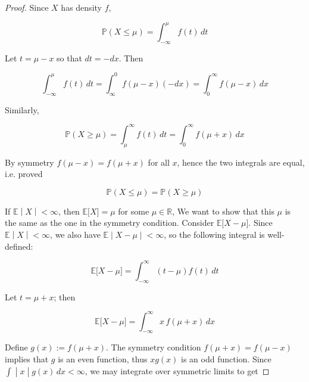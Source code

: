 \begin{proof}

Since \(\mathit{X}\) has density \(\mathit{f}\),

\[\mathbb{P}(\mathit{X} \leq \mathit{\mu}) = \int_{- \infty}^{\mathit{\mu}}\mathit{f}(\mathit{t})\,\mathit{d}\mathit{t}\]

Let \(\mathit{t} = \mathit{\mu} - \mathit{x}\) so that \(\mathit{d}\mathit{t} = - \mathit{d}\mathit{x}\). Then

\[\int_{- \infty}^{\mathit{\mu}}\mathit{f}(\mathit{t})\,\mathit{d}\mathit{t} = \int_{\infty}^{0}\mathit{f}(\mathit{\mu} - \mathit{x})( - \mathit{d}\mathit{x}) = \int_{0}^{\infty}\mathit{f}(\mathit{\mu} - \mathit{x})\,\mathit{d}\mathit{x}\]

Similarly,

\[\mathbb{P}(\mathit{X} \geq \mathit{\mu}) = \int_{\mathit{\mu}}^{\infty}\mathit{f}(\mathit{t})\,\mathit{d}\mathit{t} = \int_{0}^{\infty}\mathit{f}(\mathit{\mu} + \mathit{x})\,\mathit{d}\mathit{x}\]

By symmetry \(\mathit{f}(\mathit{\mu} - \mathit{x}) = \mathit{f}(\mathit{\mu} + \mathit{x})\) for all \(\mathit{x}\), hence the two integrals are equal, i.e. proved

\[\mathbb{P}(\mathit{X} \leq \mathit{\mu}) = \mathbb{P}(\mathit{X} \geq \mathit{\mu})\]

If \(\left. \mathbb{E} \middle| \mathit{X} \middle| < \infty \right.\), then \(\mathbb{E}\lbrack\mathit{X}\rbrack = \mathit{\mu}\) for some \(\mathit{\mu} \in \mathbb{R}\), We want to show that this \(\mathit{\mu}\) is the same as the one in the symmetry condition. Consider \(\mathbb{E}\lbrack\mathit{X} - \mathit{\mu}\rbrack\). Since \(\left. \mathbb{E} \middle| \mathit{X} \middle| < \infty \right.\), we also have \(\left. \mathbb{E} \middle| \mathit{X} - \mathit{\mu} \middle| < \infty \right.\), so the following integral is well-defined:

\[\mathbb{E}\lbrack\mathit{X} - \mathit{\mu}\rbrack = \int_{- \infty}^{\infty}(\mathit{t} - \mathit{\mu})\mathit{f}(\mathit{t})\,\mathit{d}\mathit{t}\]

Let \(\mathit{t} = \mathit{\mu} + \mathit{x}\); then

\[\mathbb{E}\lbrack\mathit{X} - \mathit{\mu}\rbrack = \int_{- \infty}^{\infty}\mathit{x}\,\mathit{f}(\mathit{\mu} + \mathit{x})\,\mathit{d}\mathit{x}\]

Define \(\mathit{g}(\mathit{x}) := \mathit{f}(\mathit{\mu} + \mathit{x})\). The symmetry condition \(\mathit{f}(\mathit{\mu} + \mathit{x}) = \mathit{f}(\mathit{\mu} - \mathit{x})\) implies that \(\mathit{g}\) is an even function, thus \(\mathit{x}\mathit{g}(\mathit{x})\) is an odd function. Since \(\left. \int \middle| \mathit{x} \middle| \mathit{g}(\mathit{x})\,\mathit{d}\mathit{x} < \infty \right.\), we may integrate over symmetric limits to get


\end{proof}
